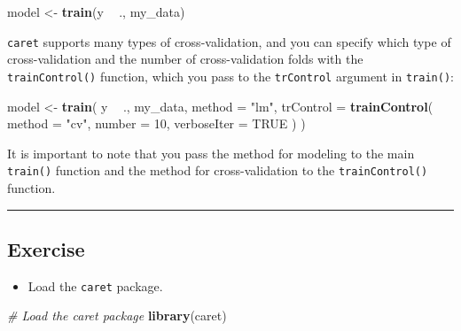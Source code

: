 \documentclass[
]{book}
\newenvironment{Shaded}{\begin{snugshade}}{\end{snugshade}}
\newcommand{\CommentTok}[1]{\textcolor[rgb]{0.56,0.35,0.01}{\textit{#1}}}
\newcommand{\DataTypeTok}[1]{\textcolor[rgb]{0.13,0.29,0.53}{#1}}
\newcommand{\DecValTok}[1]{\textcolor[rgb]{0.00,0.00,0.81}{#1}}
\newcommand{\KeywordTok}[1]{\textcolor[rgb]{0.13,0.29,0.53}{\textbf{#1}}}
\newcommand{\NormalTok}[1]{#1}
\newcommand{\OperatorTok}[1]{\textcolor[rgb]{0.81,0.36,0.00}{\textbf{#1}}}
\newcommand{\OtherTok}[1]{\textcolor[rgb]{0.56,0.35,0.01}{#1}}
\newcommand{\StringTok}[1]{\textcolor[rgb]{0.31,0.60,0.02}{#1}}
\providecommand{\tightlist}{%
  \setlength{\itemsep}{0pt}\setlength{\parskip}{0pt}}
\begin{document}
\begin{Shaded}
\begin{Highlighting}[]
\NormalTok{model <-}\StringTok{ }\KeywordTok{train}\NormalTok{(y }\OperatorTok{~}\StringTok{ }\NormalTok{., my_data)}
\end{Highlighting}
\end{Shaded}

\texttt{caret} supports many types of cross-validation, and you can specify which type of cross-validation and the number of cross-validation folds with the \texttt{trainControl()} function, which you pass to the \texttt{trControl} argument in \texttt{train()}:

\begin{Shaded}
\begin{Highlighting}[]
\NormalTok{model <-}\StringTok{ }\KeywordTok{train}\NormalTok{(}
\NormalTok{  y }\OperatorTok{~}\StringTok{ }\NormalTok{., my_data,}
  \DataTypeTok{method =} \StringTok{"lm"}\NormalTok{,}
  \DataTypeTok{trControl =} \KeywordTok{trainControl}\NormalTok{(}
    \DataTypeTok{method =} \StringTok{"cv"}\NormalTok{, }\DataTypeTok{number =} \DecValTok{10}\NormalTok{,}
    \DataTypeTok{verboseIter =} \OtherTok{TRUE}
\NormalTok{  )}
\NormalTok{)}
\end{Highlighting}
\end{Shaded}

It is important to note that you pass the method for modeling to the main \texttt{train()} function and the method for cross-validation to the \texttt{trainControl()} function.

\begin{center}\rule{0.5\linewidth}{0.5pt}\end{center}

\hypertarget{exercise-5}{%
\subsection*{Exercise}\label{exercise-5}}

\begin{itemize}
\tightlist
\item
  Load the \texttt{caret} package.
\end{itemize}

\begin{Shaded}
\begin{Highlighting}[]
\CommentTok{# Load the caret package}
\KeywordTok{library}\NormalTok{(caret)}
\end{Highlighting}
\end{Shaded}
\end{document}
